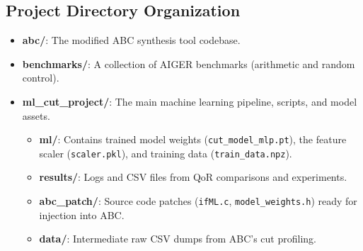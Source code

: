\documentclass[11pt,a4paper]{article}
\begin{document}
\subsection{Project Directory Organization}
\begin{itemize}
    \item \textbf{abc/}: The modified ABC synthesis tool codebase.
    \item \textbf{benchmarks/}: A collection of AIGER benchmarks (arithmetic and random control).
    \item \textbf{ml\_cut\_project/}: The main machine learning pipeline, scripts, and model assets.
    \begin{itemize}
        \item \textbf{ml/}: Contains trained model weights (\texttt{cut\_model\_mlp.pt}), the feature scaler (\texttt{scaler.pkl}), and training data (\texttt{train\_data.npz}).
        \item \textbf{results/}: Logs and CSV files from QoR comparisons and experiments.
        \item \textbf{abc\_patch/}: Source code patches (\texttt{ifML.c}, \texttt{model\_weights.h}) ready for injection into ABC.
        \item \textbf{data/}: Intermediate raw CSV dumps from ABC's cut profiling.
    \end{itemize}
\end{itemize}
\end{document}
